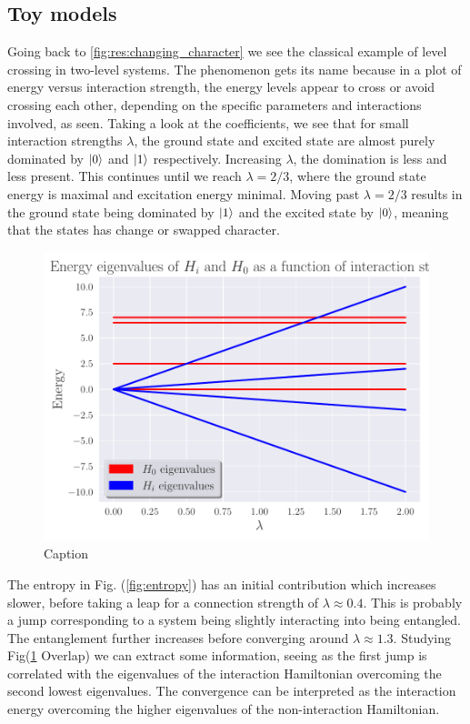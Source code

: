 \subsection{Toy models}
Going back to \cref{fig:res:changing_character} we see the classical example of level crossing in two-level systems. The phenomenon gets its name because in a plot of energy versus interaction strength, the energy levels appear to cross or avoid crossing each other, depending on the specific parameters and interactions involved, as seen. Taking a look at the coefficients, we see that for small interaction strengths $\lambda$, the ground state and excited state are almost purely dominated by $\ket{0}$ and $\ket{1}$ respectively. Increasing $\lambda$, the domination is less and less present. This continues until we reach $\lambda = 2/3$, where the ground state energy is maximal and excitation energy minimal. Moving past  $\lambda = 2/3$ results in the ground state being dominated by $\ket{1}$ and the excited state by $\ket{0}$, meaning that the states has change or swapped character.


\begin{figure}
    \centering
    \includegraphics[scale=0.4]{figs/Eig_lmd.pdf}
    \caption{Caption}
    \label{fig:eig_lmd}
\end{figure}
The entropy in Fig. (\ref{fig:entropy}) has an initial contribution which increases slower, before taking a leap for a connection strength of $\lambda \approx 0.4$. This is probably a jump corresponding to a system being slightly interacting into being entangled. The entanglement further increases before converging around $\lambda \approx 1.3$. Studying Fig(\ref{fig:eig_lmd} Overlap) we can extract some information, seeing as the first jump is correlated with the eigenvalues of the interaction Hamiltonian overcoming the second lowest eigenvalues. The convergence can be interpreted as the interaction energy overcoming the higher eigenvalues of the non-interaction Hamiltonian.
\newline\newline

